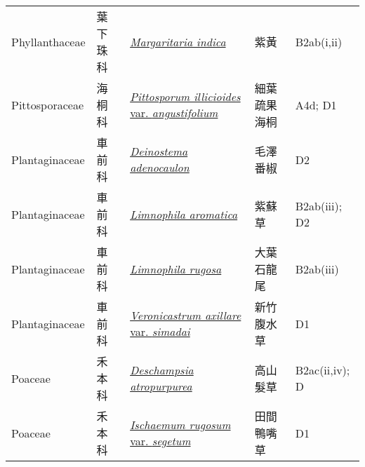 {\begin{longtable}{L{2.5cm}L{2cm}L{5cm}L{2.5cm}L{3cm}}
    Phyllanthaceae & 葉下珠科 & \href{http://www.theplantlist.org/tpl1.1/search?q=Margaritaria+indica}{\textit{Margaritaria indica} } & 紫黃 & B2ab(i,ii)    \\
    Pittosporaceae & 海桐科 & \href{http://www.theplantlist.org/tpl1.1/search?q=Pittosporum+illicioides+var.+angustifolium}{\textit{Pittosporum illicioides} var. \textit{angustifolium} } & 細葉疏果海桐 & A4d; D1    \\
    Plantaginaceae & 車前科 & \href{http://www.theplantlist.org/tpl1.1/search?q=Deinostema+adenocaulon}{\textit{Deinostema adenocaulon} } & 毛澤番椒 & D2    \\
    Plantaginaceae & 車前科 & \href{http://www.theplantlist.org/tpl1.1/search?q=Limnophila+aromatica}{\textit{Limnophila aromatica} } & 紫蘇草 & B2ab(iii); D2    \\
    Plantaginaceae & 車前科 & \href{http://www.theplantlist.org/tpl1.1/search?q=Limnophila+rugosa}{\textit{Limnophila rugosa} } & 大葉石龍尾 & B2ab(iii)    \\
    Plantaginaceae & 車前科 & \href{http://www.theplantlist.org/tpl1.1/search?q=Veronicastrum+axillare+var.+simadai}{\textit{Veronicastrum axillare} var. \textit{simadai} } & 新竹腹水草 & D1    \\
    Poaceae & 禾本科 & \href{http://www.theplantlist.org/tpl1.1/search?q=Deschampsia+atropurpurea}{\textit{Deschampsia atropurpurea} } & 高山髮草 & B2ac(ii,iv); D    \\
    Poaceae & 禾本科 & \href{http://www.theplantlist.org/tpl1.1/search?q=Ischaemum+rugosum+var.+segetum}{\textit{Ischaemum rugosum} var. \textit{segetum} } & 田間鴨嘴草 & D1    \\

\end{longtable}}
